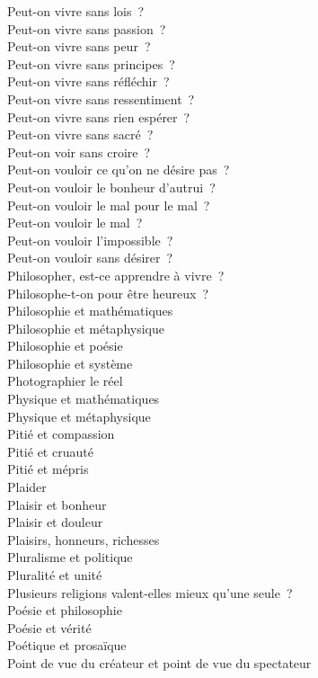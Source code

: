 \documentclass[a4paper,12pt]{article}
\begin{document}
Peut-on vivre sans lois ? \\
Peut-on vivre sans passion ? \\
Peut-on vivre sans peur ? \\
Peut-on vivre sans principes ? \\
Peut-on vivre sans réfléchir ? \\
Peut-on vivre sans ressentiment ? \\
Peut-on vivre sans rien espérer ? \\
Peut-on vivre sans sacré ? \\
Peut-on voir sans croire ? \\
Peut-on vouloir ce qu'on ne désire pas ? \\
Peut-on vouloir le bonheur d'autrui ? \\
Peut-on vouloir le mal pour le mal ? \\
Peut-on vouloir le mal ? \\
Peut-on vouloir l'impossible ? \\
Peut-on vouloir sans désirer ? \\
Philosopher, est-ce apprendre à vivre ? \\
Philosophe-t-on pour être heureux ? \\
Philosophie et mathématiques \\
Philosophie et métaphysique \\
Philosophie et poésie \\
Philosophie et système \\
Photographier le réel \\
Physique et mathématiques \\
Physique et métaphysique \\
Pitié et compassion \\
Pitié et cruauté \\
Pitié et mépris \\
Plaider \\
Plaisir et bonheur \\
Plaisir et douleur \\
Plaisirs, honneurs, richesses \\
Pluralisme et politique \\
Pluralité et unité \\
Plusieurs religions valent-elles mieux qu'une seule ? \\
Poésie et philosophie \\
Poésie et vérité \\
Poétique et prosaïque \\
Point de vue du créateur et point de vue du spectateur \\
\end{document}
